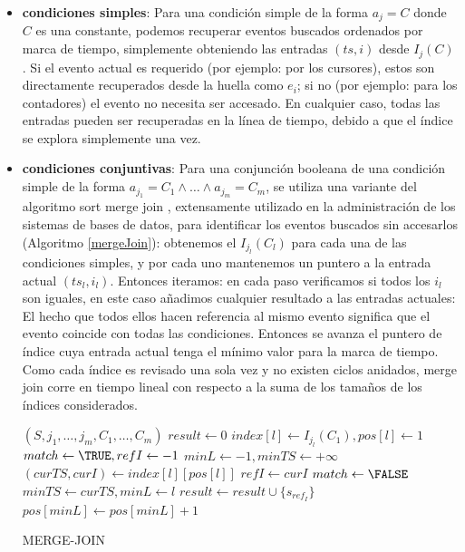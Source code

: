 \documentclass[12pt,legalpaper]{report}
\begin{document}
\begin{itemize}
	\item \textbf{condiciones simples}: Para una condición simple de la forma $a_j = C$ donde $C$ es una constante, podemos recuperar eventos buscados ordenados por marca de tiempo, simplemente obteniendo las entradas $(ts,i)$ desde $I_j(C)$.  Si el evento actual es requerido (por ejemplo: por los cursores), estos son directamente recuperados desde la huella como $e_i$; si no (por ejemplo: para los contadores) el evento no necesita ser accesado.  En cualquier caso, todas las entradas pueden ser recuperadas en la línea de tiempo, debido a que el índice se explora simplemente una vez.

	\item \textbf{condiciones conjuntivas}: Para una conjunción booleana de una condición simple de la forma $a_{j_{1}} = C_1 \wedge \dots \wedge a_{j_{m}} = C_m$, se utiliza una variante del algoritmo sort merge join \cite{sard}, extensamente utilizado en la administración de los sistemas de bases de datos, para identificar los eventos buscados sin accesarlos (Algoritmo \ref{mergeJoin}):  obtenemos el $I_{j_l} (C_l)$ para cada una de las condiciones simples, y por cada uno mantenemos un puntero a la entrada actual $(ts_l,i_l)$.  Entonces iteramos: en cada paso verificamos si todos los $i_l$ son iguales, en este caso añadimos cualquier resultado a las entradas actuales:  El hecho que todos ellos hacen referencia al mismo evento significa que el evento coincide con todas las condiciones.  Entonces se avanza el puntero de índice cuya entrada actual tenga el mínimo valor para la marca de tiempo.  Como cada índice es revisado una sola vez y no existen ciclos anidados, merge join corre en tiempo lineal con respecto a la suma de los tamaños de los índices considerados.

\begin{algorithm}
\begin{footnotesize}
\begin{algorithmic}
\REQUIRE $(S, j_{1},\dots,j_{m},C_{1},\dots,C_{m})$
\STATE $result \leftarrow 0$
\STATE $index[l] \leftarrow I_{j_{l}}(C_{1}), pos[l] \leftarrow 1$
\ENDFOR
{}
	\STATE $match \leftarrow \TRUE, ref I \leftarrow -1$
	\STATE $minL \leftarrow -1, minTS \leftarrow +\infty$
	\STATE $(curTS, curI) \leftarrow index[l][pos[l]]$
	\STATE $refI \leftarrow curI$
		\STATE $match \leftarrow \FALSE$
	\ENDIF
	\STATE $minTS \leftarrow curTS, minL \leftarrow l$
	\ENDIF
	\ENDFOR
	\STATE $result \leftarrow result \cup \{s_{ref_{I}}\}$
	\ENDIF
	\STATE $pos[minL] \leftarrow pos[minL] + 1$
\ENDWHILE
\end{algorithmic}
\end{footnotesize}
\caption{MERGE-JOIN}
\label{mergeJoin}
\end{algorithm}


\end{itemize}
\end{document}
